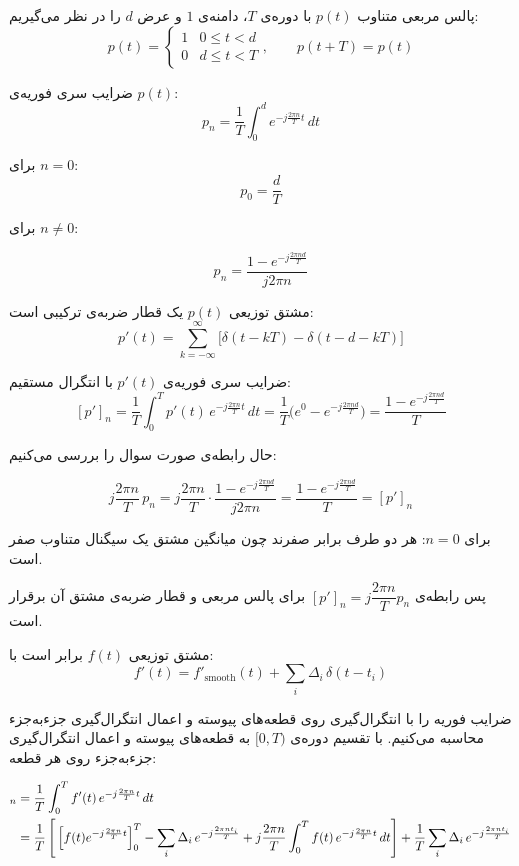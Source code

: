 
پالس مربعی متناوب $p(t)$ با دوره‌ی $T$، دامنه‌ی $1$ و عرض $d$ را در نظر می‌گیریم:
$$p(t) = \begin{cases} 1 & 0 \leq t < d \\ 0 & d \leq t < T \end{cases}, \qquad p(t+T)=p(t)$$

ضرایب سری فوریه‌ی $p(t)$:
$$p_n = \frac{1}{T}\int_0^d e^{-j\frac{2\pi n}{T}t}\,dt$$

 برای $n=0$:
  \[
  p_0 = \dfrac{d}{T}
  \]

 برای $n\neq 0$: 
    
 \[
 \displaystyle p_n = \frac{1-e^{-j\frac{2\pi nd}{T}}}{j2\pi n}
 \]

مشتق توزیعی $p(t)$ یک قطار ضربه‌ی ترکیبی است:
$$p'(t) = \sum_{k=-\infty}^{\infty}\bigl[\delta(t-kT) - \delta(t-d-kT)\bigr]$$

ضرایب سری فوریه‌ی $p'(t)$ با انتگرال مستقیم:
$$[p']_n = \frac{1}{T}\int_0^T p'(t)\,e^{-j\frac{2\pi n}{T}t}\,dt
= \frac{1}{T}\bigl(e^{0} - e^{-j\frac{2\pi nd}{T}}\bigr)
= \frac{1-e^{-j\frac{2\pi nd}{T}}}{T}$$

حال رابطه‌ی صورت سوال را بررسی می‌کنیم:

$$j\frac{2\pi n}{T}\,p_n = j\frac{2\pi n}{T} \cdot \frac{1-e^{-j\frac{2\pi nd}{T}}}{j2\pi n}
= \frac{1-e^{-j\frac{2\pi nd}{T}}}{T} = [p']_n $$

برای $n=0$: هر دو طرف برابر صفرند چون میانگین مشتق یک سیگنال متناوب صفر است.

پس رابطه‌ی $[p']_n = j\dfrac{2\pi n}{T}p_n$ برای پالس مربعی و قطار ضربه‌ی مشتق آن برقرار است.


مشتق توزیعی $f(t)$ برابر است با:
$$f'(t) = f'_{\text{smooth}}(t) + \sum_i \Delta_i\,\delta(t-t_i)$$

ضرایب فوریه را با انتگرال‌گیری روی قطعه‌های پیوسته و اعمال انتگرال‌گیری جزء‌به‌جزء محاسبه می‌کنیم. با تقسیم دوره‌ی $[0,T)$ به قطعه‌های پیوسته و اعمال انتگرال‌گیری جزء‌به‌جزء روی هر قطعه:

\begin{align*}
[f']_n &= \frac{1}{T}\int_0^T f'(t)\,e^{-j\frac{2\pi n}{T}t}\,dt \\
&= \frac{1}{T}\left[\,\Bigl[f(t)e^{-j\frac{2\pi n}{T}t}\Bigr]_0^T
   - \sum_i \Delta_i\,e^{-j\frac{2\pi n t_i}{T}}
   + j\frac{2\pi n}{T}\int_0^T f(t)\,e^{-j\frac{2\pi n}{T}t}\,dt\right]
   + \frac{1}{T}\sum_i \Delta_i\,e^{-j\frac{2\pi n t_i}{T}}
\end{align*}

